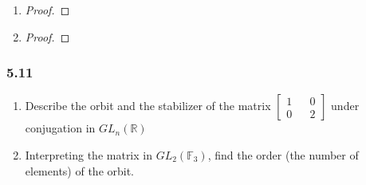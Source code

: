 \documentclass[11pt]{article}
\newcommand{\set}[1]{\mathbb{#1}}
\theoremstyle{definition}
\begin{document}
\begin{enumerate}[label=(\alph*)]
    \item \begin{proof}
        
    \end{proof}

    \item \begin{proof}
        
    \end{proof}
\end{enumerate}

\subsubsection{5.11}
\begin{enumerate}[label=(\alph*)]
    \item Describe the orbit and the stabilizer of the matrix $\begin{bmatrix}
        1 && 0 \\
        0 && 2
    \end{bmatrix}$ under conjugation in $GL_n(\set{R})$

    \item Interpreting the matrix in $GL_2(\set{F}_3)$, find the order (the number of elements) of the orbit.
\end{enumerate}
\end{document}
